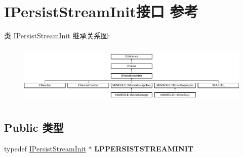 \hypertarget{interface_i_persist_stream_init}{}\section{I\+Persist\+Stream\+Init接口 参考}
\label{interface_i_persist_stream_init}
类 I\+Persist\+Stream\+Init 继承关系图\+:\begin{figure}[H]
\begin{center}
\leavevmode
\includegraphics[height=2.886598cm]{interface_i_persist_stream_init}
\end{center}
\end{figure}
\subsection*{Public 类型}
\begin{DoxyCompactItemize}
\item 
\mbox{\label{interface_i_persist_stream_init_aa5a06edeb198f93c28906afc33a835bd}} 
typedef \hyperlink{interface_i_persist_stream_init}{I\+Persist\+Stream\+Init} $\ast$ {\bfseries L\+P\+P\+E\+R\+S\+I\+S\+T\+S\+T\+R\+E\+A\+M\+I\+N\+IT}
\end{DoxyCompactItemize}
